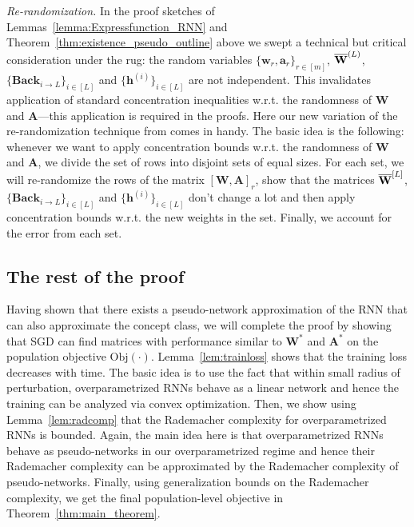 \emph{Re-randomization.} In the proof sketches of Lemmas~\ref{lemma:Expressfunction_RNN} and Theorem~\ref{thm:existence_pseudo_outline} above we swept a technical but critical consideration under the rug: the random variables $\{\mathbf{w}_r, \mathbf{a}_r\}_{r \in [m]}$, $\overline{\mathbf{W}}^{(L)}$, $\{\mathbf{Back}_{i \to L}\}_{i \in [L]}$ and $\{\mathbf{h}^{(i)}\}_{i \in [L]}$ are not independent. This invalidates application of standard concentration inequalities w.r.t. the randomness of $\mathbf{W}$ and $\mathbf{A}$---this application is required in the proofs. Here our new variation of the re-randomization technique from \cite{allen2019can} comes in handy. The basic idea is the following: whenever we want to apply concentration bounds w.r.t. the randomness of $\mathbf{W}$ and $\mathbf{A}$, we divide the set of rows into disjoint sets of equal sizes. For each set, we will re-randomize the rows of the matrix $[\mathbf{W}, \mathbf{A}]_r$, show that the matrices $\overline{\mathbf{W}}^{[L]}$, $\{\mathbf{Back}_{i \to L}\}_{i \in [L]}$ and $\{\mathbf{h}^{(i)}\}_{i \in [L]}$ don't change a lot and then apply concentration bounds w.r.t. the new weights in the set. Finally, we account for the error from each set.

\subsection{The rest of the proof}
Having shown that there exists a pseudo-network approximation of the RNN that can also approximate the concept class,
we will complete the proof by showing that SGD can find matrices with performance similar to $\mathbf{W}^{\ast}$ and $\mathbf{A}^{\ast}$ on the population objective $\mathrm{Obj(\cdot)}$. Lemma~\ref{lem:trainloss}  shows that the training loss decreases with time. The basic idea is to use the fact that within small radius of perturbation, overparametrized RNNs behave as a linear network and hence the training can be analyzed via convex optimization. Then, we show using Lemma~\ref{lem:radcomp} that the Rademacher complexity for overparametrized RNNs is bounded. Again, the main idea here is that overparametrized  RNNs behave as pseudo-networks in our overparametrized regime and hence their Rademacher complexity can be approximated by the Rademacher complexity of pseudo-networks. Finally, using generalization bounds on the Rademacher complexity, we get the final population-level objective in  Theorem~\ref{thm:main_theorem}.



